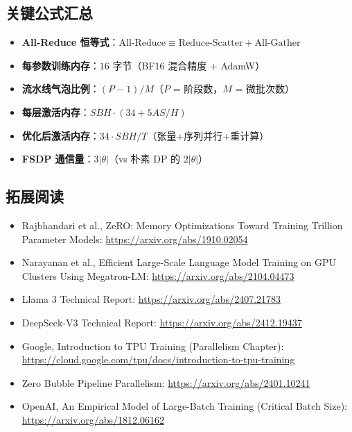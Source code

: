 \documentclass[a4paper]{article}
\begin{document}
\begin{center}
\end{center}

\subsection{关键公式汇总}

\begin{itemize}
    \item \textbf{All-Reduce 恒等式}：$\text{All-Reduce} \equiv \text{Reduce-Scatter} + \text{All-Gather}$
    \item \textbf{每参数训练内存}：$16$ 字节（BF16 混合精度 + AdamW）
    \item \textbf{流水线气泡比例}：$(P-1)/M$（$P$ = 阶段数，$M$ = 微批次数）
    \item \textbf{每层激活内存}：$SBH \cdot (34 + 5AS/H)$
    \item \textbf{优化后激活内存}：$34 \cdot SBH / T$（张量+序列并行+重计算）
    \item \textbf{FSDP 通信量}：$3|\theta|$（vs 朴素 DP 的 $2|\theta|$）
\end{itemize}

\subsection{拓展阅读}

\begin{itemize}
    \item Rajbhandari et al., ZeRO: Memory Optimizations Toward Training Trillion Parameter Models: \url{https://arxiv.org/abs/1910.02054}
    \item Narayanan et al., Efficient Large-Scale Language Model Training on GPU Clusters Using Megatron-LM: \url{https://arxiv.org/abs/2104.04473}
    \item Llama 3 Technical Report: \url{https://arxiv.org/abs/2407.21783}
    \item DeepSeek-V3 Technical Report: \url{https://arxiv.org/abs/2412.19437}
    \item Google, Introduction to TPU Training (Parallelism Chapter): \url{https://cloud.google.com/tpu/docs/introduction-to-tpu-training}
    \item Zero Bubble Pipeline Parallelism: \url{https://arxiv.org/abs/2401.10241}
    \item OpenAI, An Empirical Model of Large-Batch Training (Critical Batch Size): \url{https://arxiv.org/abs/1812.06162}
\end{itemize}
\end{document}
